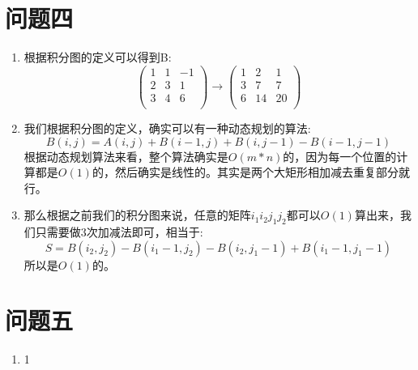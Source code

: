 \documentclass[answers]{exam}  %
\begin{document}
\section{问题四}
\begin{enumerate}[label=\alph*.] 
    \item 根据积分图的定义可以得到B:
    \[  
        \begin{pmatrix}
            1 & 1 & -1 \\
            2 & 3 & 1  \\
            3 & 4 & 6  \\
        \end{pmatrix}
        \rightarrow    
        \begin{pmatrix}
            1 & 2 & 1 \\ 
            3 & 7 & 7 \\
            6 & 14 & 20 \\
        \end{pmatrix}
    \]
    \item 我们根据积分图的定义，确实可以有一种动态规划的算法:
    \[
        B(i,j) = A(i, j) + B(i-1, j) + B(i,j -1) - B(i-1, j-1)
    \]
    根据动态规划算法来看，整个算法确实是$O(m*n)$的，因为每一个位置的计算都是$O(1)$的，然后确实是线性的。其实是两个大矩形相加减去重复部分就行。
    \item 那么根据之前我们的积分图来说，任意的矩阵$i_1i_2j_1j_2$都可以$O(1)$算出来，我们只需要做3次加减法即可，相当于:
    \[
        S  =B(i_2,j_2) - B(i_1- 1, j_2) - B(i_2, j_1-1) + B(i_1-1, j_1-1)
    \]  
    所以是$O(1)$的。
\end{enumerate}


\section{问题五}
\begin{enumerate}[label=\alph*.] 
    \item 1
\end{enumerate}
\end{document}
